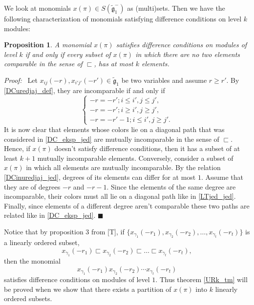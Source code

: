 \documentclass[a4paper, 10pt,oneside]{amsart}
\newtheorem{prop}[tm]{Proposition}
\newenvironment{dokaz}
{\noindent\emph{Proof:}\ }
{\hfill $\blacksquare$}
\begin{document}
We look at monomials $x(\pi)\in S({\tilde{{\mathfrak g}}}_1^-)$ as (multi)sets.
Then we have the following characterization of monomials satisfying difference
conditions on level $k$ modules:

\begin{prop} \label{UR_ekvivalencija}
A monomial $x(\pi)$ satisfies difference conditions on modules of
level $k$ if and only if every subset of $x(\pi)$ in which there are
no two elements comparable in the sense of $\sqsubset$, has at most
$k$ elements.
\end{prop}

\begin{dokaz}
 Let $x_{ij}(-r),x_{i'j'}(-r')\in{\tilde{{\mathfrak g}}}_1$ be two variables and assume $r\geq r'$. By \eqref{DCuredjaj_def}, they are incomparable if and only if
\begin{equation}
\label{DCinuredjaj_jed}
\left\{\begin{array}{l} -r = -r'; i\leq i', j\leq j',\\
-r = -r'; i\geq i', j\geq j',\\
-r=-r'-1; i\leq i', j\geq j'.
\end{array}\right.
\end{equation}
It is now clear that elements whose colors lie on a diagonal path
that was considered in \eqref{DC_eksp_jed} are mutually
incomparable in the sense of $\sqsubset$. Hence, if $x(\pi)$
doesn't satisfy difference conditions, then it has a subset of at
least $k+1$ mutually incomparable elements. Conversely, consider a
subset of $x(\pi)$ in which all elements are mutually
incomparable. By the relation \eqref{DCinuredjaj_jed}, degrees of
its elements can differ for  at most $1$. Assume that they are of
degrees $-r$ and $-r-1$. Since the elements of the same degree are
incomparable, their colors must all lie on a diagonal path like in
\eqref{LTjed_jed}. Finally, since elements of a different degree
aren't comparable these two paths are related like in
\eqref{DC_eksp_jed}.
\end{dokaz}

Notice that by proposition $3$ from [T], if $\{x_{\gamma_1}(-r_1), x_{\gamma_2}(-r_2),\dots, x_{\gamma_t}(-r_t)\}$ is a linearly ordered subset,
$$x_{\gamma_1}(-r_1) \sqsubset x_{\gamma_2}(-r_2)
\sqsubset \dots \sqsubset x_{\gamma_t}(-r_t),$$ then the monomial
$$x_{\gamma_1}(-r_1)x_{\gamma_2}(-r_2)\cdots x_{\gamma_t}(-r_t)$$
satisfies difference conditions on modules of level $1$. Thus theorem \ref{URk_tm} will be proved when we show that there exists a partition
of $x(\pi)$ into $k$
linearly ordered subsets.
\end{document}
